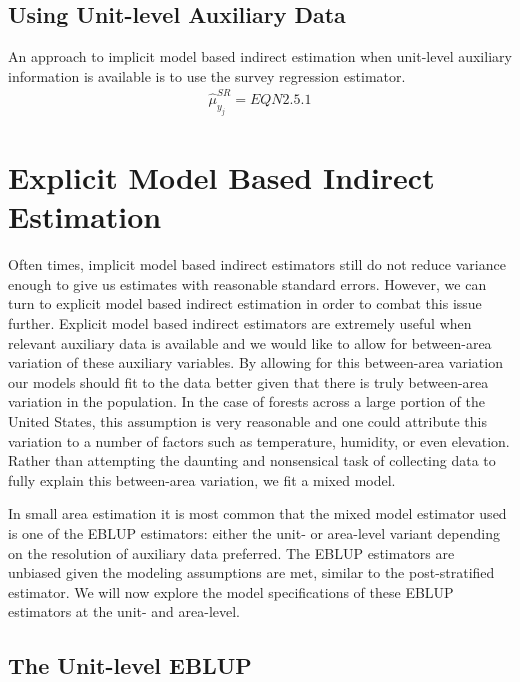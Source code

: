 \documentclass[12pt,twoside]{reedthesis}
\begin{document}
\hypertarget{using-unit-level-auxiliary-data}{%
\subsection{Using Unit-level Auxiliary Data}\label{using-unit-level-auxiliary-data}}

An approach to implicit model based indirect estimation when unit-level auxiliary information is available is to use the survey regression estimator.
\begin{align}
\hat \mu_{y_j}^{SR} = EQN 2.5.1 
\end{align}
\hypertarget{explicit-model-based-indirect-estimation}{%
\section{Explicit Model Based Indirect Estimation}\label{explicit-model-based-indirect-estimation}}

Often times, implicit model based indirect estimators still do not reduce variance enough to give us estimates with reasonable standard errors. However, we can turn to explicit model based indirect estimation in order to combat this issue further. Explicit model based indirect estimators are extremely useful when relevant auxiliary data is available and we would like to allow for between-area variation of these auxiliary variables. By allowing for this between-area variation our models should fit to the data better given that there is truly between-area variation in the population. In the case of forests across a large portion of the United States, this assumption is very reasonable and one could attribute this variation to a number of factors such as temperature, humidity, or even elevation. Rather than attempting the daunting and nonsensical task of collecting data to fully explain this between-area variation, we fit a mixed model.

In small area estimation it is most common that the mixed model estimator used is one of the EBLUP estimators: either the unit- or area-level variant depending on the resolution of auxiliary data preferred. The EBLUP estimators are unbiased given the modeling assumptions are met, similar to the post-stratified estimator. We will now explore the model specifications of these EBLUP estimators at the unit- and area-level.

\hypertarget{the-unit-level-eblup}{%
\subsection{The Unit-level EBLUP}\label{the-unit-level-eblup}}
\end{document}
